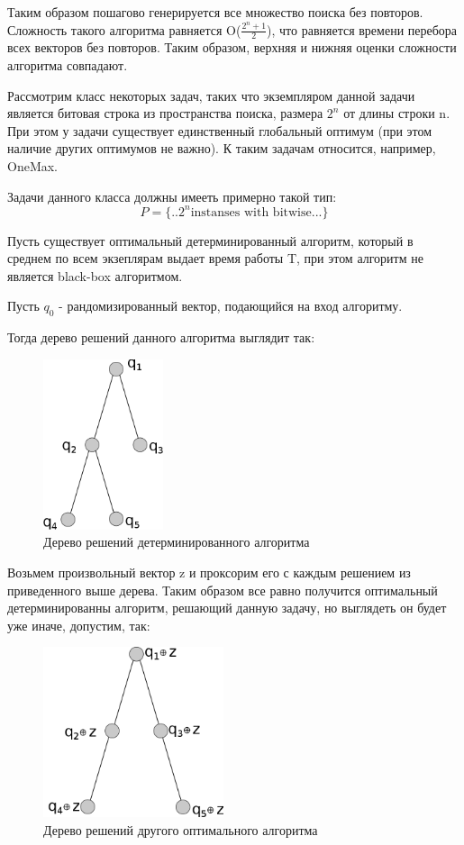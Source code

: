 Таким образом пошагово генерируется все множество поиска без повторов. Сложность такого алгоритма равняется O($\frac{2^n + 1}{2}$), что равняется времени перебора всех векторов без повторов. Таким образом, верхняя и нижняя оценки сложности алгоритма совпадают. 


Рассмотрим класс некоторых задач, таких что экземпляром данной задачи является битовая строка из пространства поиска, размера $2^n$ от длины строки n. При этом у задачи существует единственный глобальный оптимум (при этом  наличие других оптимумов не важно). К таким задачам относится, например, OneMax.

Задачи данного класса должны имееть примерно такой тип:
$$P = \{..2^n \textrm{instanses with bitwise} ... \}$$

Пусть существует оптимальный детерминированный алгоритм, который в среднем по всем экзеплярам выдает время работы T, при этом алгоритм не является black-box алгоритмом. 

Пусть $q_0$ - рандомизированный вектор, подающийся на вход алгоритму.

Тогда дерево решений данного алгоритма выглядит так: 

\begin{figure}[H]
\caption{Дерево решений детерминированного алгоритма}\label{fig2}
    \includegraphics[height=5cm]{ITMO/pic/graph1.png}
\end{figure}

Возьмем произвольный вектор z и проксорим его с каждым решением из приведенного выше дерева. Таким образом все равно получится оптимальный детерминированны алгоритм, решающий данную задачу, но выглядеть он будет уже иначе, допустим, так: 

\begin{figure}[H]
\caption{Дерево решений другого оптимального алгоритма}\label{fig2}
    \includegraphics[height=5cm]{ITMO/pic/graph2.png}
\end{figure}

